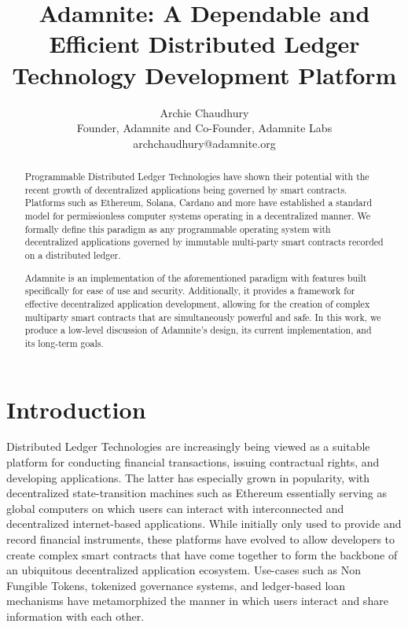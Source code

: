 \documentclass[conference]{IEEEtran}
\begin{document}
\title{Adamnite: A Dependable and Efficient Distributed Ledger Technology Development Platform\\
}
\author{
    Archie Chaudhury\\
    Founder, Adamnite and Co-Founder, Adamnite Labs\\
    archchaudhury@adamnite.org
}

\maketitle

\begin{abstract}
Programmable Distributed Ledger Technologies have shown their potential with the recent growth of decentralized applications being governed by smart contracts. Platforms such as Ethereum, Solana, Cardano and more have established a standard model for permissionless computer systems operating in a decentralized manner. We formally define this paradigm as any programmable operating system with decentralized applications governed by immutable multi-party smart contracts recorded on a distributed ledger.

Adamnite is an implementation of the aforementioned paradigm with features built specifically for ease of use and security. Additionally, it provides a framework for effective decentralized application development, allowing for the creation of complex multiparty smart contracts that are simultaneously powerful and safe. In this work, we produce a low-level discussion of Adamnite's design, its current implementation, and its long-term goals.
\end{abstract}


\section{Introduction}

Distributed Ledger Technologies are increasingly being viewed as a suitable platform for conducting financial transactions, issuing contractual rights, and developing applications. The latter has especially grown in popularity, with decentralized state-transition machines such as Ethereum essentially serving as global computers on which users can interact with interconnected and decentralized internet-based applications. While initially only used to provide and record financial instruments, these platforms have evolved to allow developers to create complex smart contracts that have come together to form the backbone of an ubiquitous decentralized application ecosystem. Use-cases such as Non Fungible Tokens, tokenized governance systems, and ledger-based loan mechanisms have metamorphized the manner in which users interact and share information with each other.
\end{document}

